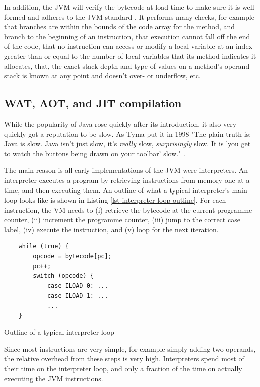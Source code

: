 In addition, the JVM will verify the bytecode at load time to make sure it is well formed and adheres to the JVM standard \cite{Lindholm:2017vu}. It performs many checks, for example that branches are within the bounds of the code array for the method, and branch to the beginning of an instruction, that execution cannot fall off the end of the code, that no instruction can access or modify a local variable at an index greater than or equal to the number of local variables that its method indicates it allocates, that, the exact stack depth and type of values on a method's operand stack is known at any point and doesn't over- or underflow, etc.

\subsection{WAT, AOT, and JIT compilation}
While the popularity of Java rose quickly after its introduction, it also very quickly got a reputation to be slow. As Tyma put it in 1998 "The plain truth is: Java is slow. Java isn't just slow, it's \emph{really} slow, \emph{surprisingly} slow. It is 'you get to watch the buttons being drawn on your toolbar' slow." \cite{Tyma:1998vj}.

The main reason is all early implementations of the JVM were interpreters. An interpreter executes a program by retrieving instructions from memory one at a time, and then executing them. An outline of what a typical interpreter's main loop looks like is shown in Listing \ref{lst-interpreter-loop-outline}. For each instruction, the VM needs to (i) retrieve the bytecode at the current programme counter, (ii) increment the programme counter, (iii) jump to the correct case label, (iv) execute the instruction, and (v) loop for the next iteration.

\begin{listing}
    \centering
    \begin{verbatim}
    while (true) {
        opcode = bytecode[pc];
        pc++;
        switch (opcode) {
            case ILOAD_0: ...
            case ILOAD_1: ...
            ...
    }
    \end{verbatim}
\caption{Outline of a typical interpreter loop}
\label{lst-interpreter-loop-outline}
\end{listing}

Since most instructions are very simple, for example simply adding two operands, the relative overhead from these steps is very high. Interpreters spend most of their time on the interpreter loop, and only a fraction of the time on actually executing the JVM instructions.

